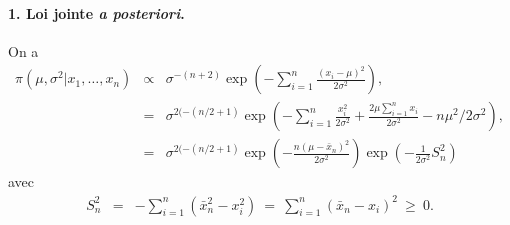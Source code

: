 \begin{rep}%
\paragraph{1. Loi jointe {\it a posteriori}.}
On a 
\begin{eqnarray*}
\pi(\mu,\sigma^2|x_1,\ldots,x_n) & \propto & \sigma^{-(n+2)} \exp\left(-\sum\limits_{i=1}^n \frac{(x_i-\mu)^2}{2\sigma^2}\right), \\
& = & \sigma^{2(-(n/2+1)} \exp \left(-\sum\limits_{i=1}^n \frac{x^2_i}{2\sigma^2} +\frac{2\mu\sum\limits_{i=1}^n x_i}{2\sigma^2} - n\mu^2/2\sigma^2 \right), \\
& = & \sigma^{2(-(n/2+1)} \exp \left( - \frac{n\left(\mu-\bar{x}_n\right)^2}{2\sigma^2}
\right) \exp \left( -\frac{1}{2\sigma^2} S_n^2\right)
\end{eqnarray*}
avec
\begin{eqnarray*}
S^2_n & = & -\sum\limits_{i=1}^n \left(\bar{x}^2_n-x^2_i\right) \ = \  \sum\limits_{i=1}^n \left(\bar{x}_n-x_i\right)^2 \ \geq \ 0.
\end{eqnarray*}

\end{rep}
